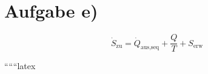 \section*{Aufgabe e)}


\[
\dot{S}_{\text{zu}} = \dot{Q}_{\text{aus,seq}} + \frac{Q}{T} + S_{\text{erw}}
\]

``````latex